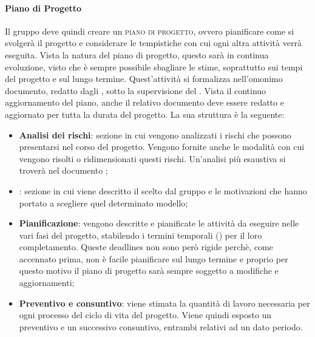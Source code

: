 \documentclass[../norme-di-progetto.tex]{subfiles}
\begin{document}
\paragraph{Piano di Progetto}
Il gruppo deve quindi creare un \textsc{piano di progetto}, ovvero pianificare come si svolgerà il progetto e considerare le tempistiche con cui ogni altra attività verrà eseguita. Vista la natura del piano di progetto, questo sarà in continua evoluzione, visto che è sempre possibile sbagliare le stime, soprattutto sui tempi del progetto e sul lungo termine. Quest'attività si formalizza nell'omonimo documento, redatto dagli \emph{}, sotto la supervisione del . Vista il continuo aggiornamento del piano, anche il relativo documento deve essere redatto e aggiornato per tutta la durata del progetto. La sua struttura è la seguente:
\begin{itemize}
    \item \textbf{Analisi dei rischi}: sezione in cui vengono analizzati i rischi che possono presentarsi nel corso del progetto. Vengono fornite anche le modalità con cui vengono risolti o ridimensionati questi rischi. Un'analisi più esaustiva si troverà nel documento ;
    \item {}: sezione in cui viene descritto il  scelto dal gruppo e le motivazioni che hanno portato a scegliere quel determinato modello;
    \item \textbf{Pianificazione}: vengono descritte e pianificate le attività da eseguire nelle vari fasi del progetto, stabilendo i termini temporali () per il loro completamento. Queste deadlines non sono però rigide perchè, come accennato prima, non è facile pianificare sul lungo termine e proprio per questo motivo il piano di progetto sarà sempre soggetto a modifiche e aggiornamenti;
    \item \textbf{Preventivo e consuntivo}: viene stimata la quantità di lavoro necessaria per ogni processo del ciclo di vita del progetto. Viene quindi esposto un preventivo e un successivo consuntivo, entrambi relativi ad un dato periodo.
\end{itemize}
\end{document}
